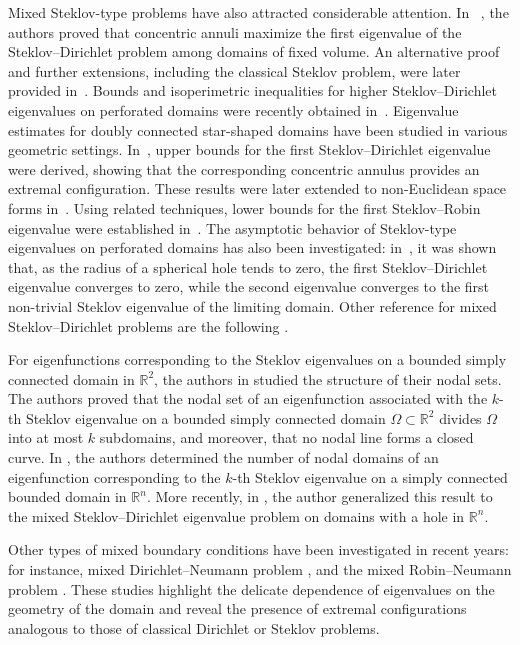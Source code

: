 \documentclass[12pt,reqno]{amsart}
\numberwithin{equation}{section}
\numberwithin{theorem}{section}
\numberwithin{equation}{section}
\numberwithin{theorem}{section}
\begin{document}
Mixed Steklov-type problems have also attracted considerable attention.
In ~\cite{verma2020eigenvalue}, the authors proved that concentric
annuli maximize the first eigenvalue of the Steklov--Dirichlet problem among
domains of fixed volume. An alternative proof and further extensions,
including the classical Steklov problem, were later provided
in~\cite{ftouhi2022place}. Bounds and isoperimetric inequalities for higher
Steklov--Dirichlet eigenvalues on perforated domains were recently obtained
in~\cite{Basak_Chorwadwala_Verma_2025, sannipoli2025estimates}. Eigenvalue estimates for doubly connected star-shaped domains have been
studied in various geometric settings. In~\cite{gavitone2023isoperimetric},
upper bounds for the first Steklov--Dirichlet eigenvalue were derived,
showing that the corresponding concentric annulus provides an extremal
configuration. These results were later extended to non-Euclidean space
forms in~\cite{Basak_Chorwadwala_Verma_2025}. Using related techniques,
lower bounds for the first Steklov--Robin eigenvalue were established
in~\cite{gavitone2023steklov}. The asymptotic behavior of Steklov-type eigenvalues on perforated domains has
also been investigated:  in~\cite{sannipoli2025estimates}, it was shown that,
as the radius of a spherical hole tends to zero, the first
Steklov--Dirichlet eigenvalue converges to zero, while the second eigenvalue
converges to the first non-trivial Steklov eigenvalue of the limiting
domain.
Other reference for mixed
Steklov--Dirichlet problems are the following 
\cite{ gavitone2024monotonicity,
hong2020shape, GloriaPaoli2021C, verma2020eigenvalue}.

For eigenfunctions corresponding to the Steklov eigenvalues on a bounded simply connected domain in $\mathbb{R}^2$, the authors in \cite{KS1969} studied the structure of their nodal sets. The authors proved that the nodal set of an eigenfunction associated with the $k$-th Steklov eigenvalue on a bounded simply connected domain $\Omega \subset \mathbb{R}^2$ divides $\Omega$ into at most $k$ subdomains, and moreover, that no nodal line forms a closed curve.
In \cite{AM1994}, the authors determined the number of nodal domains of an eigenfunction corresponding to the $k$-th Steklov eigenvalue on a simply connected bounded domain in $\mathbb{R}^n$. More recently, in \cite{sannipoli2025estimates}, the author generalized this result to the mixed Steklov--Dirichlet eigenvalue problem on domains with a hole in $\mathbb{R}^n$.  



 Other types of mixed boundary conditions have been investigated in recent years: for instance, mixed Dirichlet--Neumann
problem \cite{anoop2022szego1, anoop2020reverse, anoop2021shape}, and the mixed
Robin--Neumann problem
\cite{cito2025optimality, cito2025stability, paoli2020sharp}. These studies highlight the delicate dependence of eigenvalues on the geometry of the
domain and reveal the presence of extremal configurations analogous to those
of classical Dirichlet or Steklov problems.
\end{document}
